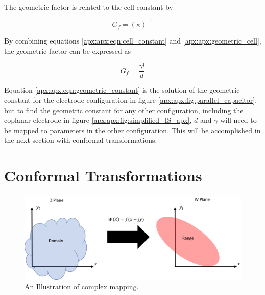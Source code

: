   \noindent The geometric factor is related to the cell constant by 
  
  \begin{equation}
       G_f = (\kappa)^{-1}
       \label{apx:apx:geometric_cell}
  \end{equation}

  \noindent By combining equations \ref{apx:apx:eqn:cell_constant} and \ref{apx:apx:geometric_cell}, the geometric factor can be expressed as
  
  \begin{equation}
      G_f = \frac{\gamma l}{d}
      \label{apx:apx:eqn:geometric_constant}
  \end{equation}
  
  \par Equation \ref{apx:apx:eqn:geometric_constant} is the solution of the geometric constant for the electrode configuration in figure \ref{apx:apx:fig:parallel_capacitor}, but to find the geometric constant for any other configuration, including the coplanar electrode in figure \ref{apx:apx:fig:simplified_IS_apx}, $d$ and $\gamma$ will need to be mapped to parameters in the other configuration. This will be accomplished in the next section with conformal transformations.
  
  
  \section{Conformal Transformations}
  \label{apx:apx:app:conformal_mapping}
  
  \begin{figure}[h]
  \centering
  \includegraphics[width=\textwidth]{images/mapping.png}
  \caption[Illustration of complex mapping.]{An Illustration of complex mapping.}
  \label{apx:apx:fig:mapping}
  \end{figure}
  
